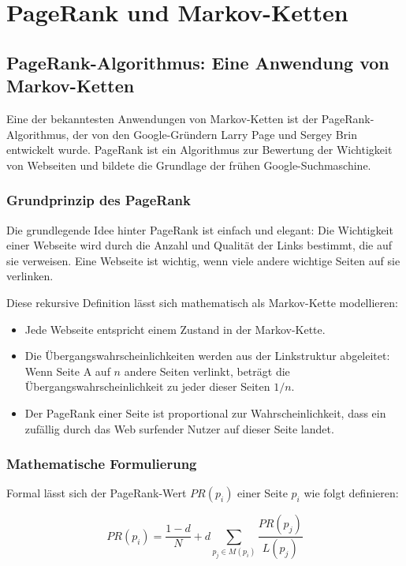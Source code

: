 \chapter{PageRank und Markov-Ketten}
\label{ch:pagerank-markov}

\section{PageRank-Algorithmus: Eine Anwendung von Markov-Ketten}

Eine der bekanntesten Anwendungen von Markov-Ketten ist der PageRank-Algorithmus, der von den Google-Gründern Larry Page und Sergey Brin entwickelt wurde. PageRank ist ein Algorithmus zur Bewertung der Wichtigkeit von Webseiten und bildete die Grundlage der frühen Google-Suchmaschine.

\subsection{Grundprinzip des PageRank}

Die grundlegende Idee hinter PageRank ist einfach und elegant: Die Wichtigkeit einer Webseite wird durch die Anzahl und Qualität der Links bestimmt, die auf sie verweisen. Eine Webseite ist wichtig, wenn viele andere wichtige Seiten auf sie verlinken.

Diese rekursive Definition lässt sich mathematisch als Markov-Kette modellieren:

\begin{itemize}
    \item Jede Webseite entspricht einem Zustand in der Markov-Kette.
    \item Die Übergangswahrscheinlichkeiten werden aus der Linkstruktur abgeleitet: Wenn Seite A auf $n$ andere Seiten verlinkt, beträgt die Übergangswahrscheinlichkeit zu jeder dieser Seiten $1/n$.
    \item Der PageRank einer Seite ist proportional zur Wahrscheinlichkeit, dass ein zufällig durch das Web surfender Nutzer auf dieser Seite landet.
\end{itemize}

\subsection{Mathematische Formulierung}

Formal lässt sich der PageRank-Wert $PR(p_i)$ einer Seite $p_i$ wie folgt definieren:

\[
    PR(p_i) = \frac{1-d}{N} + d \sum_{p_j \in M(p_i)} \frac{PR(p_j)}{L(p_j)}
\]

